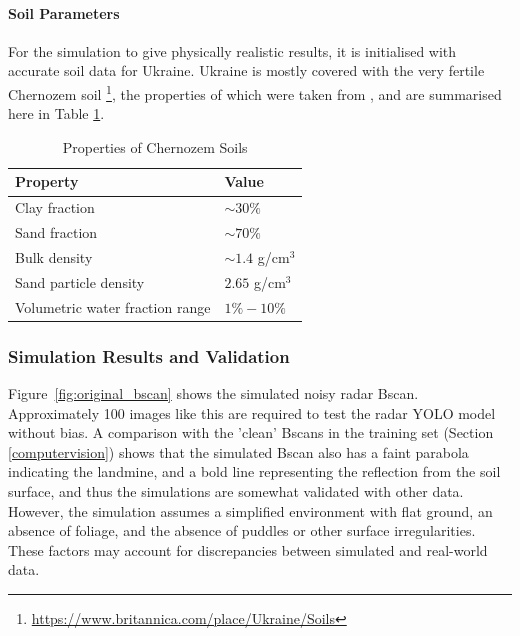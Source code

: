         \paragraph{Soil Parameters}

            For the simulation to give physically realistic results, it is initialised with accurate soil data for Ukraine. Ukraine is mostly covered with the very fertile Chernozem soil \footnote{\url{https://www.britannica.com/place/Ukraine/Soils}}, the properties of which were taken from \cite{suleymanov2021chernozem}, and are summarised here in Table \ref{tab:chernozem}.

            \begin{table}[htbp]
              \centering
              \caption{Properties of Chernozem Soils}
              \begin{tabular}{@{} l l @{}} 
                \toprule
                \textbf{Property} & \textbf{Value} \\
                \midrule
                Clay fraction & $\sim 30\%$ \\
                Sand fraction & $\sim 70\%$ \\
                Bulk density & $\sim 1.4$ g/cm$^3$ \\
                Sand particle density & $2.65$ g/cm$^3$ \\
                Volumetric water fraction range & $1\% - 10\%$ \\
                \bottomrule
              \end{tabular}
              \label{tab:chernozem}
            \end{table}
    

    
    \subsubsection{Simulation Results and Validation}

        \noindent Figure~\ref{fig:original_bscan} shows the simulated noisy radar Bscan. Approximately 100 images like this are required to test the radar YOLO model without bias. A comparison with the 'clean' Bscans in the training set (Section \ref{computervision}) shows that the simulated Bscan also has a faint parabola indicating the landmine, and a bold line representing the reflection from the soil surface, and thus the simulations are somewhat validated with other data. However, the simulation assumes a simplified environment with flat ground, an absence of foliage, and the absence of puddles or other surface irregularities. These factors may account for discrepancies between simulated and real-world data.


